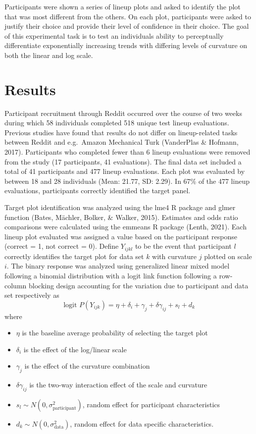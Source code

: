 \documentclass[print]{nuthesis}
\begin{document}
Participants were shown a series of lineup plots and asked to identify the plot that was most different from the others.
On each plot, participants were asked to justify their choice and provide their level of confidence in their choice.
The goal of this experimental task is to test an individuals ability to perceptually differentiate exponentially increasing trends with differing levels of curvature on both the linear and log scale.

\hypertarget{results}{%
\section{Results}\label{results}}

Participant recruitment through Reddit occurred over the course of two weeks during which 58 individuals completed 518 unique test lineup evaluations.
Previous studies have found that results do not differ on lineup-related tasks between Reddit and e.g.~Amazon Mechanical Turk (VanderPlas \& Hofmann, 2017).
Participants who completed fewer than 6 lineup evaluations were removed from the study (17 participants, 41 evaluations).
The final data set included a total of 41 participants and 477 lineup evaluations.
Each plot was evaluated by between 18 and 28 individuals (Mean: 21.77, SD: 2.29).
In 67\% of the 477 lineup evaluations, participants correctly identified the target panel.

Target plot identification was analyzed using the lme4 R package and glmer function (Bates, Mächler, Bolker, \& Walker, 2015). Estimates and odds ratio comparisons were calculated using the emmeans R package (Lenth, 2021).
Each lineup plot evaluated was assigned a value based on the participant response (correct = 1, not correct = 0).
Define \(Y_{ijkl}\) to be the event that participant \(l\) correctly identifies the target plot for data set \(k\) with curvature \(j\) plotted on scale \(i\).
The binary response was analyzed using generalized linear mixed model following a binomial distribution with a logit link function following a row-column blocking design accounting for the variation due to participant and data set respectively as
\begin{equation}
\text{logit }P(Y_{ijk}) = \eta + \delta_i + \gamma_j + \delta \gamma_{ij} + s_l + d_k
\end{equation}
where

\begin{itemize}
\item $\eta$ is the baseline average probability of selecting the target plot
\item $\delta_i$ is the effect of the log/linear scale
\item $\gamma_j$ is the effect of the curvature combination
\item $\delta\gamma_{ij}$ is the two-way interaction effect of the scale and curvature
\item $s_l \sim N(0,\sigma^2_\text{participant})$, random effect for participant characteristics
\item $d_k \sim N(0,\sigma^2_{\text{data}})$, random effect for data specific characteristics. 
\end{itemize}
\end{document}
